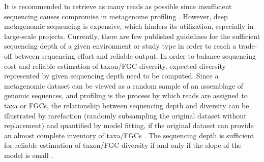 \documentclass[11pt]{article}
\begin{document}
  It is recommended to retrieve as many reads as possible \citep{quince2017shotgun} since insufficient sequencing causes compromise in metagenome profiling \citep{cattonaro2018you,zaheer2018impact,pereira2019impact,gweon2019impact}. 
  However, deep metagenomic sequencing is expensive, which hinders its utilization, especially in large-scale projects. 
  Currently, there are few published guidelines for the sufficient sequencing depth of a given environment or study type in order to reach a trade-off between sequencing effort and reliable output. 
  \newline
  In order to balance sequencing cost and reliable estimation of taxon/FGC diversity, expected diversity represented by given sequencing depth need to be computed. 
  Since a metagenomic dataset can be viewed as a random sample of an assemblage of genomic sequences, and profiling is the process by which reads are assigned to taxa or FGCs, the relationship between sequencing depth and diversity can be illustrated by rarefaction (randomly subsampling the original dataset without replacement) and quantified by model fitting, if the original dataset can provide an almost complete inventory of taxa/FGCs \citep{heck1975explicit,hortal2005ed,gomez2014using,hughes2021sampling}. 
  The sequencing depth is sufficient for reliable estimation of taxon/FGC diversity if and only if the slope of the model is small \citep{hortal2005ed,chao2012coverage,roswell2021conceptual}. 
\end{document}
